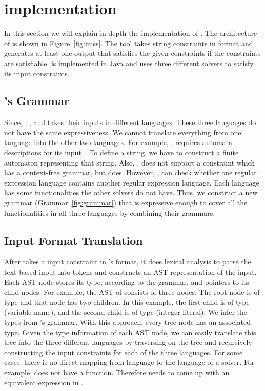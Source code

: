 \section{implementation}
\label{sec:implementation}
In this section we will explain in-depth the implementation of \imss.
The architecture of \imss is shown
in Figure~\ref{fig:imss}. The tool takes string constraints in \imss format
and generates at least one output that satisfies the given constraints if the constraints are satisfiable.
\imss is implemented in Java and uses three different solvers to satisfy its input constraints.


\subsection{\imss's Grammar}
Since, \hampi, \dprle, and \zstr takes their inputs in
 different languages. These three languages do not have the same expressiveness.
 We cannot translate everything from one language into the other two languages. For example,
 \dprle, requires automata descriptions for its input~\cite{lazystrings2010}.
 To define a string, we have to construct a finite automaton representing that string.
 Also, \dprle, does not support a constraint which has a context-free grammar,
 but \hampi does. However, \dprle, can check whether one regular expression language
 contains another regular expression language. Each language has some functionalities the
 other solvers do not have. Thus, we construct a new grammar (Grammar~\ref{fig:grammar}) that is expressive enough to
 cover all the functionalities in all three languages by combining their grammars.

\subsection{Input Format Translation}
After \imss takes a input constraint in \imss's format, it does lexical analysis to parse
the text-based input into tokens and constructs an AST representation of the input.
Each AST node stores its type, according to the grammar, and pointers to its child nodes.
For example, the AST of  consists of three nodes. The root node is of type
 and that node has two children. In this example, the first child is of type  (variable name), and
the second child is of type  (integer literal). We infer the types from \imss's grammar.
With this approach, every tree node has an associated type. Given the type information of
each AST node, we can easily translate this tree into the three different languages by traversing
on the tree and recursively constructing the input constraints for each of the three languages.
For some cases, there is no direct mapping from \imss language to the language of
a solver.
For example, \dprle does not have a  function. Therefore \imss needs to come up with an equivalent
expression in \dprle.

